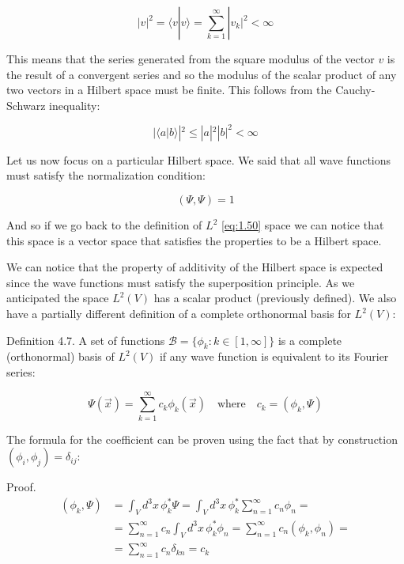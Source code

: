 \documentclass[italian]{HKNdocument}
\begin{document}
\begin{equation}
|v|^2 = \langle v|v\rangle = \sum_{k=1}^{\infty}|v_k|^2 < \infty
\end{equation}

This means that the series generated from the square modulus of the vector $v$ is the result of a convergent series and so the modulus of the scalar product of any two vectors in a Hilbert space must be finite. This follows from the Cauchy-Schwarz inequality:

\begin{equation}
|\langle a|b\rangle|^2 \leq |a|^2|b|^2 < \infty
\end{equation}

Let us now focus on a particular Hilbert space. We said that all wave functions must satisfy the normalization condition:

\begin{equation}
(\Psi, \Psi) = 1
\end{equation}

And so if we go back to the definition of $L^2$ \eqref{eq:1.50} space we can notice that this space is a vector space that satisfies the properties to be a Hilbert space.

We can notice that the property of additivity of the Hilbert space is expected since the wave functions must satisfy the superposition principle. As we anticipated the space $L^2(V)$ has a scalar product (previously defined). We also have a partially different definition of a complete orthonormal basis for $L^2(V)$:

Definition 4.7. A set of functions $\mathcal{B} = \{\phi_k: k \in [1,\infty]\}$ is a complete (orthonormal) basis of $L^2(V)$ if any wave function is equivalent to its Fourier series:

\begin{equation}
\Psi(\vec{x}) = \sum_{k=1}^{\infty} c_k\phi_k(\vec{x}) \quad \text{where} \quad c_k = (\phi_k, \Psi)
\end{equation}

The formula for the coefficient can be proven using the fact that by construction $(\phi_i, \phi_j) = \delta_{ij}$:

Proof.
\begin{align}
(\phi_k, \Psi) &= \int_V d^3x\,\phi_k^*\Psi = \int_V d^3x\,\phi_k^*\sum_{n=1}^{\infty}c_n\phi_n = \\
&= \sum_{n=1}^{\infty}c_n\int_V d^3x\,\phi_k^*\phi_n = \sum_{n=1}^{\infty}c_n(\phi_k, \phi_n) =  \\
&= \sum_{n=1}^{\infty}c_n\delta_{kn} = c_k
\end{align}
\end{document}
